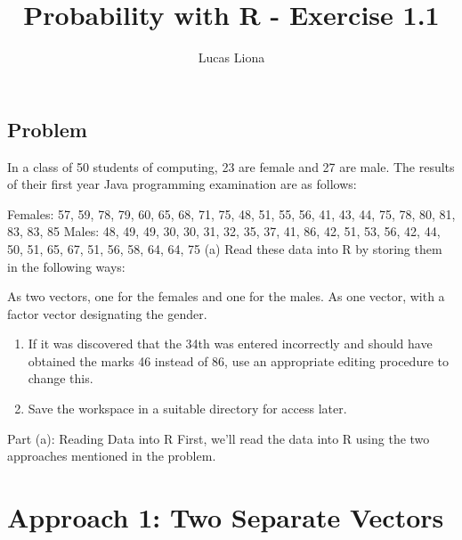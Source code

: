 \documentclass[
  letterpaper,
  DIV=11,
  numbers=noendperiod]{scrartcl}
\title{Probability with R - Exercise 1.1}
\author{Lucas Liona}
\date{}
\providecommand{\tightlist}{%
  \setlength{\itemsep}{0pt}\setlength{\parskip}{0pt}}\usepackage{longtable,booktabs,array}
\renewcommand*\contentsname{Table of contents}
\newcommand\contentsname{Table of contents}
\begin{document}
\maketitle

\renewcommand*\contentsname{Table of contents}
{
\hypersetup{linkcolor=}
\setcounter{tocdepth}{3}
\tableofcontents
}

\subsection{Problem}\label{problem}

In a class of 50 students of computing, 23 are female and 27 are male.
The results of their first year Java programming examination are as
follows:

Females: 57, 59, 78, 79, 60, 65, 68, 71, 75, 48, 51, 55, 56, 41, 43, 44,
75, 78, 80, 81, 83, 83, 85 Males: 48, 49, 49, 30, 30, 31, 32, 35, 37,
41, 86, 42, 51, 53, 56, 42, 44, 50, 51, 65, 67, 51, 56, 58, 64, 64, 75
(a) Read these data into R by storing them in the following ways:

As two vectors, one for the females and one for the males. As one
vector, with a factor vector designating the gender.

\begin{enumerate}
\def\labelenumi{(\alph{enumi})}
\setcounter{enumi}{1}
\tightlist
\item
  If it was discovered that the 34th was entered incorrectly and should
  have obtained the marks 46 instead of 86, use an appropriate editing
  procedure to change this.
\item
  Save the workspace in a suitable directory for access later.
\end{enumerate}

Part (a): Reading Data into R First, we'll read the data into R using
the two approaches mentioned in the problem.

\section{Approach 1: Two Separate
Vectors}\label{approach-1-two-separate-vectors}
\end{document}
